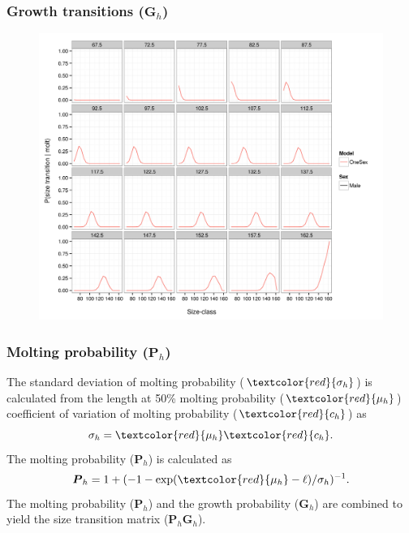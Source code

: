 \documentclass{beamer}
\begin{document}

\begin{frame}
\frametitle{Growth transitions ($\boldsymbol{G}_h$)}
\begin{figure}[!htbp]
  \centering
  \includegraphics[width=0.75\linewidth]{../../examples/bbrkc/OneSex/figure/growth_transition.png}
\end{figure}
\end{frame}


\begin{frame}
\frametitle{Molting probability ($\boldsymbol{P}_h$)}
The standard deviation of molting probability ($\textcolor{red}{\sigma_h}$) is
calculated from the length at 50\% molting probability
($\textcolor{red}{\mu_h}$) coefficient of variation of molting probability
($\textcolor{red}{c_h}$) as
\begin{equation*}
  \sigma_h = \textcolor{red}{\mu_h} \textcolor{red}{c_h}.
\end{equation*}
The molting probability ($\boldsymbol{P}_h$) is calculated as
\begin{equation*}
  \boldsymbol{P}_h = 1 + (-1 - \exp(\textcolor{red}{\mu_h} - \ell) / \sigma_h)^{-1}.
\end{equation*}
The molting probability ($\boldsymbol{P}_h$) and the growth probability
($\boldsymbol{G}_h$) are combined to yield the size transition matrix
($\boldsymbol{P}_h \boldsymbol{G}_h$).
\end{frame}
\end{document}
